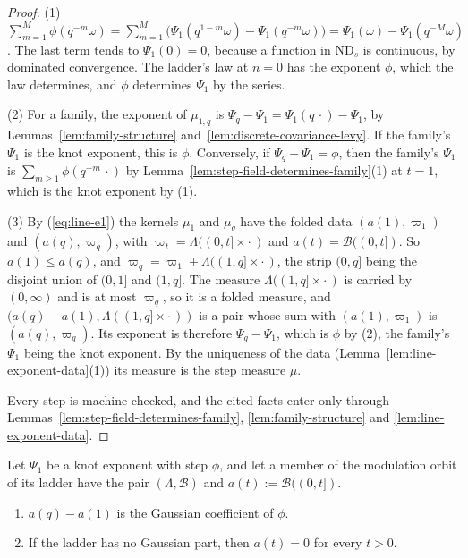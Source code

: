 \begin{proof}
(1) $\sum_{m=1}^M\phi(q^{-m}\omega) = \sum_{m=1}^M\bigl(\Psi_1(q^{1-m}\omega) - \Psi_1(q^{-m}\omega)\bigr)
= \Psi_1(\omega) - \Psi_1(q^{-M}\omega)$. The last term tends to $\Psi_1(0) = 0$, because a function
in $\mathrm{ND}_s$ is continuous, by dominated convergence. The ladder's law at $n = 0$ has the
exponent $\phi$, which the law determines, and $\phi$ determines $\Psi_1$ by the series.

(2) For a family, the exponent of $\mu_{1,q}$ is $\Psi_q - \Psi_1 = \Psi_1(q\,\cdot) - \Psi_1$, by
Lemmas~\ref{lem:family-structure} and~\ref{lem:discrete-covariance-levy}. If the family's
$\Psi_1$ is the knot exponent, this is $\phi$. Conversely, if $\Psi_q - \Psi_1 = \phi$, then the
family's $\Psi_1$ is $\sum_{m \ge 1}\phi(q^{-m}\,\cdot)$ by
Lemma~\ref{lem:step-field-determines-family}(1) at $t = 1$, which is the knot exponent by (1).

(3) By (\ref{eq:line-e1}) the kernels $\mu_1$ and $\mu_q$ have the folded data $(a(1), \varpi_1)$ and
$(a(q), \varpi_q)$, with $\varpi_t = \Lambda((0,t] \times \cdot\,)$ and $a(t) = \mathcal{B}((0,t])$.
So $a(1) \le a(q)$, and $\varpi_q = \varpi_1 + \Lambda((1,q] \times \cdot\,)$, the strip
$(0,q]$ being the disjoint union of $(0,1]$ and $(1,q]$. The measure $\Lambda((1,q] \times \cdot\,)$
is carried by $(0,\infty)$ and is at most $\varpi_q$, so it is a folded \Levy{} measure, and
$(a(q) - a(1), \Lambda((1,q] \times \cdot\,))$ is a pair whose sum with $(a(1), \varpi_1)$ is
$(a(q), \varpi_q)$. Its exponent is therefore $\Psi_q - \Psi_1$, which is $\phi$ by (2), the
family's $\Psi_1$ being the knot exponent. By the uniqueness of the data
(Lemma~\ref{lem:line-exponent-data}(1)) its measure is the step measure $\mu$.

Every step is machine-checked, and the cited facts enter only through
Lemmas~\ref{lem:step-field-determines-family}, \ref{lem:family-structure} and
\ref{lem:line-exponent-data}.
\end{proof}

\begin{lemma}
\label{lem:member-gaussian-part}

Let $\Psi_1$ be a knot exponent with step $\phi$, and let a member of the modulation orbit of its
ladder have the pair $(\Lambda, \mathcal{B})$ and $a(t) := \mathcal{B}((0,t])$.
\begin{enumerate}
\item $a(q) - a(1)$ is the Gaussian coefficient of $\phi$.
\item If the ladder has no Gaussian part, then $a(t) = 0$ for every $t > 0$.
\end{enumerate}
\end{lemma}

